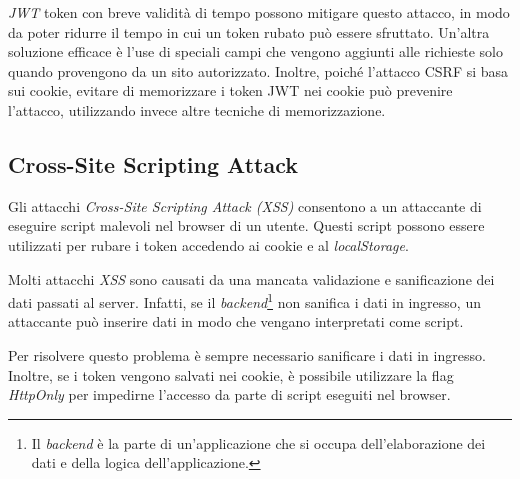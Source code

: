 \emph{JWT} token con breve validità di tempo possono mitigare questo attacco, in modo da poter ridurre il tempo in cui un token rubato può essere sfruttato.
Un'altra soluzione efficace è l'use di speciali campi che vengono aggiunti alle richieste solo quando provengono da un sito autorizzato.
Inoltre, poiché l'attacco CSRF si basa sui cookie, evitare di memorizzare i token JWT nei cookie può prevenire l'attacco, utilizzando invece altre tecniche di memorizzazione.

\subsection{Cross-Site Scripting Attack}
Gli attacchi \emph{Cross-Site Scripting Attack (XSS)} consentono a un attaccante di eseguire script malevoli nel browser di un utente.
Questi script possono essere utilizzati per rubare i token accedendo ai cookie e al \emph{localStorage}.

Molti attacchi \emph{XSS} sono causati da una mancata validazione e sanificazione dei dati passati al server.
Infatti, se il \emph{backend}\footnote{Il \emph{backend} è la parte di un'applicazione che si occupa dell'elaborazione dei dati e della logica dell'applicazione.} non sanifica i dati in ingresso, un attaccante può inserire dati in modo che vengano interpretati come script.

Per risolvere questo problema è sempre necessario sanificare i dati in ingresso.
Inoltre, se i token vengono salvati nei cookie, è possibile utilizzare la flag \emph{HttpOnly} per impedirne l'accesso da parte di script eseguiti nel browser.
